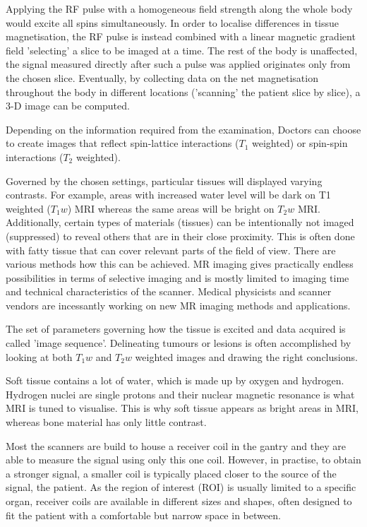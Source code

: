 Applying the RF pulse with a homogeneous field strength along the whole body would excite all spins simultaneously.
In order to localise differences in tissue magnetisation, the RF pulse is instead combined with a linear magnetic gradient field 'selecting' a slice to be imaged at a time.
The rest of the body is unaffected, the signal measured directly after such a pulse was applied originates only from the chosen slice.
Eventually, by collecting data on the net magnetisation throughout the body in different locations ('scanning' the patient slice by slice), a 3-D image can be computed.

Depending on the information required from the examination, Doctors can choose to create images that reflect spin-lattice interactions ($T_1$ weighted) or spin-spin interactions ($T_2$ weighted).

Governed by the chosen settings, particular tissues will displayed varying contrasts.
For example, areas with increased water level will be dark on T1 weighted ($T_1w$) MRI whereas the same areas will be bright on $T_2w$ MRI.
Additionally, certain types of materials (tissues) can be intentionally not imaged (suppressed) to reveal others that are in their close proximity.
This is often done with fatty tissue that can cover relevant parts of the field of view.
There are various methods how this can be achieved.
MR imaging gives practically endless possibilities in terms of selective imaging and is mostly limited to imaging time and technical characteristics of the scanner.
Medical physicists and scanner vendors are incessantly working on new MR imaging methods and applications. 

The set of parameters governing how the tissue is excited and data acquired is called 'image sequence'.
Delineating tumours or lesions is often accomplished by looking at both $T_1w$ and $T_2w$ weighted images and drawing the right conclusions.

Soft tissue contains a lot of water, which is made up by oxygen and hydrogen.
Hydrogen nuclei are single protons and their nuclear magnetic resonance is what MRI is tuned to visualise.
This is why soft tissue appears as bright areas in MRI, whereas bone material has only little contrast. \cite{Currie2013}


Most the scanners are build to house a receiver coil in the gantry and they are able to measure the signal using only this one coil.
However, in practise, to obtain a stronger signal, a smaller coil is typically placed closer to the source of the signal, the patient.
As the region of interest (ROI) is usually limited to a specific organ, receiver coils are available in different sizes and shapes, often designed to fit the patient with a comfortable but narrow space in between.


